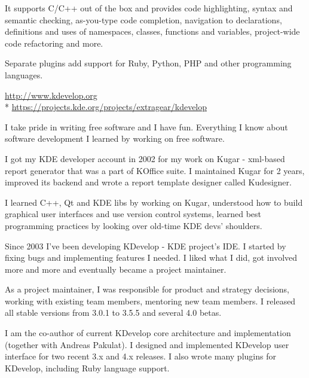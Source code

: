 \documentclass[12pt]{letter}
\begin{document}
\begin{llist}
           \item It supports C/C++ out of the box and provides code highlighting, syntax and semantic checking,  as-you-type code completion, navigation to declarations, definitions and uses of namespaces, classes, functions and variables, project-wide code refactoring and more.

            \item Separate plugins add support for Ruby, Python, PHP and other programming languages.

            \item \url{http://www.kdevelop.org}\\*
                  \url{https://projects.kde.org/projects/extragear/kdevelop}

            \item I take pride in writing free software and I have fun. Everything I know about software development I learned by working on free software.

            \item I got my KDE developer account in 2002 for my work on Kugar - xml-based report generator that was a part of KOffice suite. I maintained Kugar for 2 years, improved its backend and wrote a report template designer called Kudesigner.

            \item I learned C++, Qt and KDE libs by working on Kugar, understood how to build graphical user interfaces and use   version control systems, learned best programming practices by looking over old-time KDE devs' shoulders.

            \item Since 2003 I've been developing KDevelop - KDE project's IDE. I started by fixing bugs and implementing features I needed. I liked what I did, got involved more and more and eventually became a project maintainer.

            \item As a project maintainer, I was responsible for product and strategy decisions, working with existing team members, mentoring new team members. I released all stable versions from 3.0.1 to 3.5.5 and several 4.0 betas.

            \item I am the co-author of current KDevelop core architecture and implementation (together with Andreas Pakulat). I designed and implemented KDevelop user interface for two recent 3.x and 4.x releases. I also wrote many plugins for KDevelop, including Ruby language support.


\end{llist}
\end{document}
